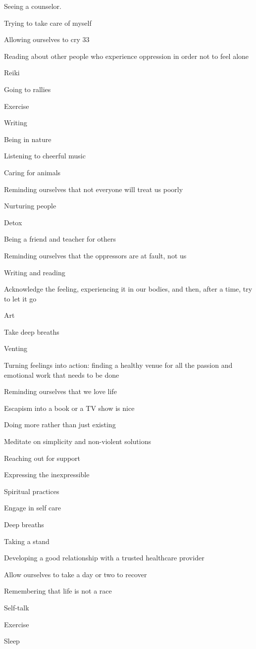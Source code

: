 \begin{multicols}{2}
\begin{checkboxlist}
\item Seeing a counselor.
\item Trying to take care of myself
\item Allowing ourselves to cry
33\item Reading about other people who experience oppression in order not to feel alone
\item Reiki
\item Going to rallies
\item Exercise
\item Writing
\item Being in nature
\item Listening to cheerful music
\item Caring for animals
\item Reminding ourselves that not everyone will treat us poorly
\item Nurturing people
\item Detox
\item Being a friend and teacher for others
\item Reminding ourselves that the oppressors are at fault, not us
\item Writing and reading
\item Acknowledge the feeling, experiencing it in our bodies, and then, after a time, try to let it go
\item Art
\item Take deep breaths
\item Venting
\item Turning feelings into action: finding a healthy venue for all the passion and emotional work that needs to be done
\item Reminding ourselves that we love life
\item Escapism into a book or a TV show is nice
\item Doing more rather than just existing
\item Meditate on simplicity and non-violent solutions
\item Reaching out for support
\item Expressing the inexpressible
\item Spiritual practices
\item Engage in self care
\item Deep breaths
\item Taking a stand
\item Developing a good relationship with a trusted healthcare provider
\item Allow ourselves to take a day or two to recover
\item Remembering that life is not a race
\item Self-talk
\item Exercise
\item Sleep
\end{checkboxlist}
\end{multicols}

